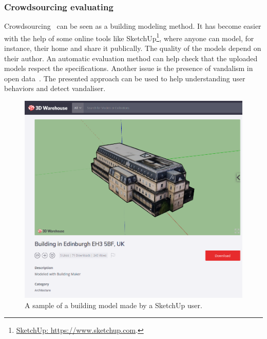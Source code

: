             \subsubsection{Crowdsourcing evaluating}
            Crowdsourcing~\parencite{kovashka2016crowdsourcing} can be seen as a building modeling method.
            It has become easier with the help of some online tools like SketchUp\footnote{
                \href{https://www.sketchup.com}{SketchUp: https://www.sketchup.com}.
            }, where anyone can model, for instance, their home and share it publically.
            The quality of the models depend on their author.
            An automatic evaluation method can help check that the uploaded models respect the specifications.
            Another issue is the presence of vandalism in open data~\parencite{neis2012towards}.
            The presented approach can be used to help understanding user behaviors and detect vandaliser.
            \begin{figure}[htpb]
                \centering
                \includegraphics[width=.7\textwidth]{images/introduction/use/crowdsourcing}
                \caption{
                    \label{fig::crowdsourcing}
                    A sample of a building model made by a SketchUp user.
                }
            \end{figure}

